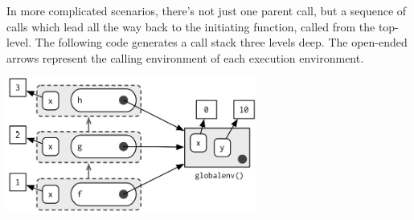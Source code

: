 \begin{Shaded}
\begin{Highlighting}[]
\StringTok{ }
  \StringTok{ }
    \StringTok{ }\NormalTok{(}\NormalTok{, }\NormalTok{())}
    \StringTok{ }\NormalTok{(}\NormalTok{, }\NormalTok{())}
    \NormalTok{(}  
  \NormalTok{\}}
\NormalTok{\}}
\StringTok{ }\NormalTok{()}
\StringTok{ }
\NormalTok{(}\NormalTok{())}
\end{Highlighting}
\end{Shaded}

In more complicated scenarios, there's not just one parent call, but a
sequence of calls which lead all the way back to the initiating
function, called from the top-level. The following code generates a call
stack three levels deep. The open-ended arrows represent the calling
environment of each execution environment.

\begin{Shaded}
\begin{Highlighting}[]
\StringTok{ }
\StringTok{ }
\StringTok{ }
  \StringTok{ }
  \NormalTok{()}
\NormalTok{\}}
\StringTok{ }
  \StringTok{ }
  \NormalTok{()}
\NormalTok{\}}
\StringTok{ }
  \StringTok{ }
  \StringTok{ }
\NormalTok{\}}
\NormalTok{()}
\end{Highlighting}
\end{Shaded}

\includegraphics[width=3.25in]{diagrams/environments.png/calling.png}

